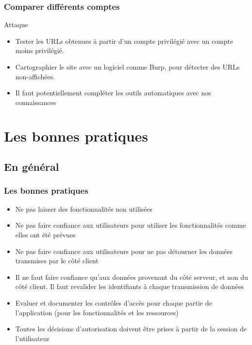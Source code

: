 \documentclass{beamer}
\begin{document}
\begin{frame}
  \frametitle{Comparer différents comptes}
  \begin{alertblock}{Attaque}
    \begin{itemize}
      \item Tester les URLs obtenues à partir d'un compte privilégié avec un compte moins privilégié.
      \item Cartographier le site avec un logiciel comme Burp, pour détecter des URLs non-affichées.
      \item Il faut potentiellement compléter les outils automatiques avec nos connaissances
    \end{itemize}
  \end{alertblock}
\end{frame}


\section{Les bonnes pratiques}
\subsection{En général}
\begin{frame}
  \frametitle{Les bonnes pratiques}
  \begin{exampleblock}{}
    \begin{itemize}
      \item Ne pas laisser des fonctionnalités non utilisées
    \end{itemize}
  \end{exampleblock}
  \begin{exampleblock}{}
    \begin{itemize}
      \item Ne pas faire confiance aux utilisateurs pour utiliser les fonctionnalités comme elles ont été prévues
      \item Ne pas faire confiance aux utilisateurs pour ne pas détourner les données transmises par le côté client
      \item Il ne faut faire confiance qu'aux données provenant du côté serveur, et non du côté client. Il faut revalider les identifiants à chaque transmission de données
    \end{itemize}
  \end{exampleblock}
  \begin{exampleblock}{}
    \begin{itemize}
      \item Evaluer et documenter les contrôles d'accès pour chaque partie de l'application (pour les fonctionnalités et les ressources)
    \end{itemize}
  \end{exampleblock}
  \begin{exampleblock}{}
    \begin{itemize}
      \item Toutes les décisions d'autorisation doivent être prises à partir de la session de l'utilisateur
    \end{itemize}
  \end{exampleblock}
\end{frame}
\end{document}

